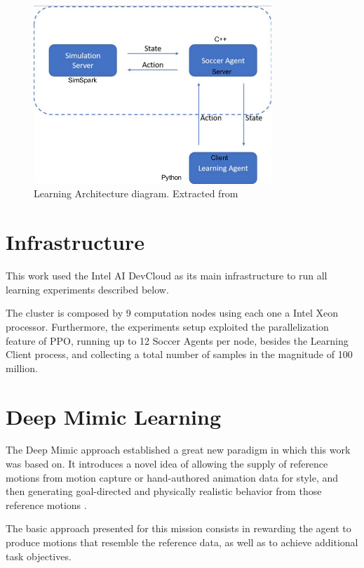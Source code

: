 \begin{figure}[H]
    \centering
    \includegraphics[width=0.8\textwidth]{Chapter6/architecture.png} 
    \caption{Learning Architecture diagram. Extracted from \cite{TGMuzio}}
    \label{fig:RL_framework}
\end{figure}

\section{Infrastructure}

This work used the Intel AI DevCloud as its main infrastructure to run all learning experiments described below.

The cluster is composed by 9 computation nodes using each one a Intel Xeon processor. Furthermore, the experiments setup exploited the parallelization feature of PPO, running up to 12 Soccer Agents per node, besides the Learning Client process, and collecting a total number of samples in the magnitude of 100 million.

\section{Deep Mimic Learning}

The Deep Mimic approach \cite{deepmimic} established a great new paradigm in which this work was based on. It introduces a novel idea of allowing the supply of reference motions from motion capture or hand-authored animation data for style, and then generating goal-directed and physically realistic behavior from those reference motions \cite{deepmimic}.

The basic approach presented for this mission consists in rewarding the agent to produce motions that resemble the reference data, as well as to achieve additional task objectives.

